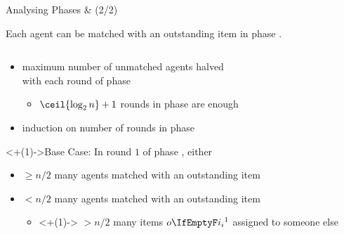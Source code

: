 \begin{frame}{Analysing Phases \phasei{} \& \phaseiii{} (2/2)}
	\adjustfortopblock
	\begin{lemma}
		Each agent can be matched with an outstanding item in phase \phaseiii.
	\end{lemma}
	\begin{columns}[T]
		\begin{column}{0.6\textwidth}
			\begin{itemize}[<+(1)->]
				\item
				maximum number of unmatched agents halved \\
				with each round of phase \phasei
				\begin{itemize}[<+(1)->]
					\item
					\(\ceil{\log_2 n} + 1\) rounds in phase \phasei{} are enough
				\end{itemize}

				\item
				induction on number of rounds in phase \phasei
			\end{itemize}
			\onslide<+(1)->{Base Case: In round \(1\) of phase \phasei, either}
			\begin{itemize}[<+(1)->]
				\item
				\(\ge n/2\) many agents matched with an outstanding item

				\item
				\(< n/2\) many agents matched with an outstanding item
				\begin{itemize}
					\item<+(1)->
					\(> n/2\) many items \(\asgd*{1}\) assigned to someone else


\end{itemize}
\end{itemize}
\end{column}
\end{columns}
\end{frame}
